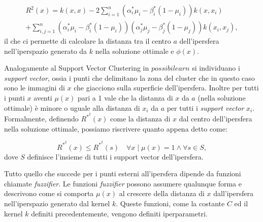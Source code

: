 \documentclass[12pt,italian]{report}
\begin{document}
\begin{equation}
\begin{split}
R^2(x) = k(x, x) - 2\sum_{i=1}^{n} (\alpha_{i}^* \mu_{i} - \beta_{i}^*(1-\mu_{i}))k(x, x_{i}) \\+ \sum_{i,j = 1}^{n}(\alpha_{i}^* \mu_{i} - \beta_{i}^*(1-\mu_{i}))(\alpha_{j}^* \mu_{j} - \beta_{j}^*(1-\mu_{j}))k(x_{i}, x_{j}),
\end{split}
\end{equation}
il che ci permette di calcolare la distanza tra il centro $a$ dell'ipersfera nell'iperspazio generato da $k$ nella soluzione ottimale e $\phi(x)$.

Analogamente al Support Vector Clustering in $possibilearn$ si individuano i \emph{support vector}, ossia i punti che delimitano la zona del cluster che in questo caso sono le immagini di $x $ che giacciono sulla superficie dell'ipersfera. Inoltre per tutti i punti $x$ aventi $ \mu(x) $ pari a 1 vale che la distanza di $x$ da $a$ (nella soluzione ottimale) è minore o uguale alla distanza di $x_{i}$ da $a$ per tutti i \emph{support vector} $x_{i}$.
Formalmente, definendo $ R^{*^2}(x) $ come la distanza di $x$ dal centro dell'ipersfera nella soluzione ottimale, possiamo riscrivere quanto appena detto come:

\[ R^{*^2}(x) \leq R^{*^2}(s) \quad \forall x \mid \mu(x) = 1 \wedge \forall s \in S, \]
dove $S$ definisce l'insieme di tutti i support vector dell'ipersfera.

Tutto quello che succede per i punti esterni all'ipersfera dipende da funzioni chiamate \emph{fuzzifier}. Le funzioni \emph{fuzzifier} possono assumere qualunque forma e descrivono come si comporta $ \mu(x) $ al crescere della distanza di $x$ dall'ipersfera nell'iperspazio generato dal kernel $k$. Queste funzioni, come la costante $C$ ed il kernel $k$ definiti precedentemente, vengono definiti iperparametri. 
\end{document}
